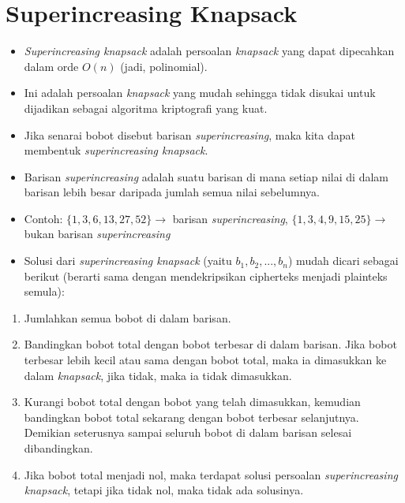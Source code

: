 \documentclass{article}
\begin{document}
\section*{Superincreasing Knapsack}

\begin{itemize}
    \item \textit{Superincreasing knapsack} adalah persoalan \textit{knapsack} yang dapat dipecahkan dalam orde $O(n)$ (jadi, polinomial).
    \item Ini adalah persoalan \textit{knapsack} yang mudah sehingga tidak disukai untuk dijadikan sebagai algoritma kriptografi yang kuat.
    \item Jika senarai bobot disebut barisan \textit{superincreasing}, maka kita dapat membentuk \textit{superincreasing knapsack}.
    \item Barisan \textit{superincreasing} adalah suatu barisan di mana setiap nilai di dalam barisan lebih besar daripada jumlah semua nilai sebelumnya.
    \item Contoh: $\{1, 3, 6, 13, 27, 52\} \rightarrow$ barisan \textit{superincreasing},
    $\{1, 3, 4, 9, 15, 25\} \rightarrow$ bukan barisan \textit{superincreasing}
\end{itemize}

\newpage


\begin{itemize}
    \item Solusi dari \textit{superincreasing knapsack} (yaitu $b_1, b_2, ..., b_n$) mudah dicari sebagai berikut (berarti sama dengan mendekripsikan cipherteks menjadi plainteks semula):
\end{itemize}

\begin{enumerate}
    \item Jumlahkan semua bobot di dalam barisan.
    \item Bandingkan bobot total dengan bobot terbesar di dalam barisan. Jika bobot terbesar lebih kecil atau sama dengan bobot total, maka ia dimasukkan ke dalam \textit{knapsack}, jika tidak, maka ia tidak dimasukkan.
    \item Kurangi bobot total dengan bobot yang telah dimasukkan, kemudian bandingkan bobot total sekarang dengan bobot terbesar selanjutnya. Demikian seterusnya sampai seluruh bobot di dalam barisan selesai dibandingkan.
    \item Jika bobot total menjadi nol, maka terdapat solusi persoalan \textit{superincreasing knapsack}, tetapi jika tidak nol, maka tidak ada solusinya.
\end{enumerate}
\end{document}
